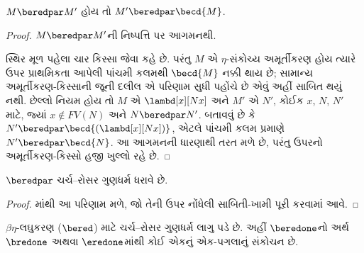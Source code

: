 \begin{lem}
  $M \beredpar M'$ હોય તો
  $M' \beredpar \becd{M}$.
\end{lem}

\begin{proof}
  $M \beredpar M'$ની નિષ્પત્તિ પર આગમનથી.

  સ્થિર મૂળ પહેલા ચાર કિસ્સા
   જેવા કહે છે. પરંતુ
  $M$ એ $\eta$-સંકોચ્ય અમૂર્તીકરણ હોય ત્યારે
  ઉપર પ્રાથમિકતા આપેલી પાંચમી કલમથી
  $\becd{M}$ નક્કી થાય છે; સામાન્ય
  અમૂર્તીકરણ-કિસ્સાની જૂની દલીલ એ પરિણામ સુધી
  પહોંચે છે એવું અહીં સાબિત થયું નથી.
  છેલ્લો નિયમ  હોય તો
  $M$ એ $\lambd[x][Nx]$ અને $M'$ એ $N'$, કોઈક
  $x$, $N$, $N'$ માટે, જ્યાં $x \notin FV(N)$ અને
  $N \beredpar N'$. બતાવવું છે કે
  $N' \beredpar \becd{(\lambd[x][Nx])}$,
  એટલે પાંચમી કલમ પ્રમાણે
  $N' \beredpar \becd{N}$. આ આગમનની ધારણાથી
  તરત મળે છે, પરંતુ ઉપરનો અમૂર્તીકરણ-કિસ્સો
  હજી ખુલ્લો રહે છે.
\end{proof}

\begin{thm}
  $\beredpar$ ચર્ચ--રોસર ગુણધર્મ ધરાવે છે.
\end{thm}

\begin{proof}
  માંથી આ પરિણામ મળે, જો તેની
  ઉપર નોંધેલી સાબિતી-ખામી પૂરી કરવામાં આવે.
\end{proof}
\endgroup

\begingroup
\makeatletter{}\makeatother


\label{guunit:OLP-0372}


$\beta\eta$-લઘુકરણ ($\bered$) માટે ચર્ચ--રોસર
ગુણધર્મ લાગુ પડે છે. અહીં $\beredone$નો અર્થ
$\bredone$ અથવા $\eredone$માંથી કોઈ એકનું
એક-પગલાનું સંકોચન છે.

